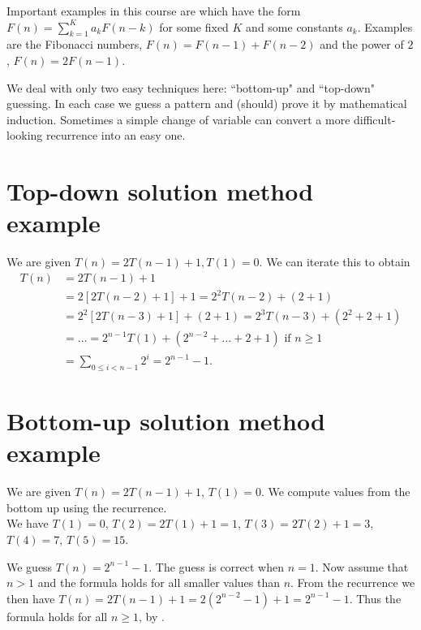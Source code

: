 Important examples  in this course are  which have the form 
$F(n) = \sum_{k=1}^K a_k F(n - k)$ for some fixed $K$ and some constants $a_k$. 
Examples are the Fibonacci numbers, $F(n) = F(n-1) + F(n-2)$ and the power of $2$, $F(n) = 2F(n-1)$.

We deal with only two easy techniques here: ``bottom-up" and ``top-down" guessing. 
In each case we guess a pattern and (should) prove it by mathematical induction. 
Sometimes a simple change of variable can convert a more difficult-looking recurrence into an easy one. 

\section{Top-down solution method example}
\begin{Boxample}
We are given $T(n) = 2 T(n - 1) + 1, T(1) = 0$. We can iterate this to obtain 
\begin{align*}
T(n) & = 2 T(n - 1) + 1  \\
& = 2 [2 T(n - 2) + 1] + 1 = 2^2 T(n-2) + (2 + 1) \\
& = 2^2 [2T(n - 3) + 1] + (2 + 1) = 2^3 T(n - 3) + (2^2 + 2+ 1)  \\ 
& = \dots = 2^{n-1} T(1) + (2^{n-2} + \dots + 2 + 1)  \text{ if $n \geq 1$} \\
& = \sum_{0\leq i < n-1} 2^i = 2^{n-1} - 1\text{.}
\end{align*}
\end{Boxample}

\section{Bottom-up solution method example}
\begin{Boxample}
We are given $T(n) = 2 T(n - 1) + 1$, $T(1) = 0$. 
We compute values from the bottom up using the recurrence.\\


We have $T(1) = 0$, $T(2) = 2T(1) + 1 = 1$, $T(3) = 2T(2) + 1 = 3$, $T(4) = 7$, $T(5) = 15$. 

We guess $T(n) = 2^{n-1} - 1$. The guess is correct when $n = 1$.
Now assume that $n > 1$ and the formula holds for all smaller values than $n$. 
From the recurrence we then have 
$T(n) = 2T(n-1) + 1 = 2(2^{n-2} - 1) + 1 = 2^{n-1} - 1$. 
Thus the formula holds for all $n \geq 1$, by .
\end{Boxample}

